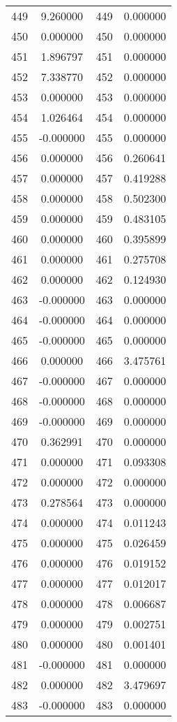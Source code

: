 \documentclass[12pt]{article}
\begin{document}
\begin{longtable}{@{}cccc@{}}
449 & 9.260000 & 449 & 0.000000 \\
450 & 0.000000 & 450 & 0.000000 \\
451 & 1.896797 & 451 & 0.000000 \\
452 & 7.338770 & 452 & 0.000000 \\
453 & 0.000000 & 453 & 0.000000 \\
454 & 1.026464 & 454 & 0.000000 \\
455 & -0.000000 & 455 & 0.000000 \\
456 & 0.000000 & 456 & 0.260641 \\
457 & 0.000000 & 457 & 0.419288 \\
458 & 0.000000 & 458 & 0.502300 \\
459 & 0.000000 & 459 & 0.483105 \\
460 & 0.000000 & 460 & 0.395899 \\
461 & 0.000000 & 461 & 0.275708 \\
462 & 0.000000 & 462 & 0.124930 \\
463 & -0.000000 & 463 & 0.000000 \\
464 & -0.000000 & 464 & 0.000000 \\
465 & -0.000000 & 465 & 0.000000 \\
466 & 0.000000 & 466 & 3.475761 \\
467 & -0.000000 & 467 & 0.000000 \\
468 & -0.000000 & 468 & 0.000000 \\
469 & -0.000000 & 469 & 0.000000 \\
470 & 0.362991 & 470 & 0.000000 \\
471 & 0.000000 & 471 & 0.093308 \\
472 & 0.000000 & 472 & 0.000000 \\
473 & 0.278564 & 473 & 0.000000 \\
474 & 0.000000 & 474 & 0.011243 \\
475 & 0.000000 & 475 & 0.026459 \\
476 & 0.000000 & 476 & 0.019152 \\
477 & 0.000000 & 477 & 0.012017 \\
478 & 0.000000 & 478 & 0.006687 \\
479 & 0.000000 & 479 & 0.002751 \\
480 & 0.000000 & 480 & 0.001401 \\
481 & -0.000000 & 481 & 0.000000 \\
482 & 0.000000 & 482 & 3.479697 \\
483 & -0.000000 & 483 & 0.000000 \\

\end{longtable}
\end{document}
